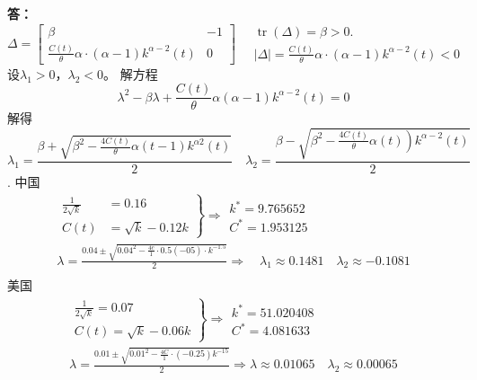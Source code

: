 \documentclass[12pt, a4paper, oneside]{article}
\newcounter{answername}
\newenvironment{answer}{\stepcounter{answername}\par\noindent\textbf{答：}\newline}{\\\par}
\begin{document}
\begin{CJK*}{UTF8}{gbsn}
\begin{answer}
$$$$
$$
\Delta=\left[\begin{array}{cc}\beta & -1 \\ \frac{C(t)}{\theta} \alpha \cdot(\alpha-1) k^{\alpha-2}(t) & 0\end{array}\right] \quad \begin{array}{l}\operatorname{tr}(\Delta)=\beta>0 . \\ |\Delta|=\frac{C(t)}{\theta} \alpha \cdot(\alpha-1) k^{\alpha-2}(t)<0\end{array}
$$
设$\lambda_1>0$，$\lambda_2<0$。
解方程
$$
\lambda^{2}-\beta \lambda+\frac{C(t)}{\theta} \alpha(\alpha-1) k^{\alpha-2}(t)=0
$$
解得
$$\lambda_{1}=\frac{\beta+\sqrt{\beta^{2}-\frac{4 C(t)}{\theta} \alpha(t-1) k^{\alpha 2}(t)}}{2} \quad \lambda_{2}=\frac{\beta-\sqrt{\left.\beta^{2}-\frac{4 C(t)}{\theta} \alpha(t)\right) k^{\alpha-2}(t)}}{2}$$
.
中国
$$
\begin{array}{l}\left.\begin{array}{ll}\frac{1}{2 \sqrt{k}} & =0.16 \\ C(t) & =\sqrt{k}-0.12 k\end{array}\right\} \Rightarrow \begin{array}{l}k^{*}=9.765652 \\ C^{*}=1.953125\end{array} \\ \lambda=\frac{0.04 \pm \sqrt{0.04^{2}-\frac{4 c}{1} \cdot 0.5(-05) \cdot k^{-1.5}}}{2} \Rightarrow \quad \lambda_{1} \approx 0.1481 \quad \lambda_{2} \approx-0.1081 \\\end{array}
$$
美国
$$
\begin{array}{l}\left.\begin{array}{l}\frac{1}{2 \sqrt{k}}=0.07 \\ C(t)=\sqrt{k}-0.06 k\end{array}\right\} \Rightarrow \begin{array}{l}k^{*}=51.020408 \\ C^{*}=4.081633\end{array} \\ \lambda=\frac{0.01 \pm \sqrt{0.01^{2}-\frac{4 C}{1} \cdot(-0.25) k^{-15}}}{2} \Rightarrow \lambda \approx 0.01065 \quad \lambda_{2} \approx 0.00065 \\\end{array}
$$
\end{answer}
\end{CJK*}
\end{document}
